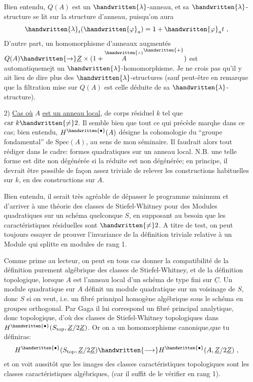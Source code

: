 Bien entendu, $Q(A)$ est un $\handwritten{\lambda}$-anneau, et sa $\handwritten{\lambda}$-structure se lit sur la structure d'anneau, puisqu'on aura
\[
\handwritten{\lambda}_t(\handwritten{\varphi}_a)=1+\handwritten{\varphi}_a t\ ,
\]
D'autre part, un homomorphisme d'anneaux augmentés $Q(A)\handwritten{\to}\underline{Z}\times(1+\overset{\handwritten{\scriptscriptstyle\wedge}}{A}^{\handwritten{+}})$ est automatiquemejt un $\handwritten{\lambda}$-homomorphisme. Je ne crois pas qu'il y ait lieu de dire plus des $\handwritten{\lambda}$-structures (sauf peut-être en remarque que la filtration mise sur $Q(A)$ est celle déduite de sa $\handwritten{\lambda}$-structure).

2) \uline{Cas où} $A$ \uline{est un anneau local}, de corps résiduel $k$ tel que $\mathrm{car}\ k\handwritten{\ne}2$. Il semble bien que tout ce qui précède marqhe dans ce cas; bien entendu, $H^{\handwritten{\bullet}}(A)$ désigne la cohomologie du ``groupe fondamental'' de $\mathrm{Spec}(A)$, au sens de mon séminaire. Il faudrait alors tout rédiger dans le cadre: formes quadratiques sur un anneau local. N.B. une telle forme est dite non dégénérée si la réduite est non dégénérée; en principe, il  devrait être possible de façon assez triviale de relever les constructions habituelles sur $k$, en des constructions sur $A$.

Bien entendu, il serait très agréable de dépasser le programme minimum et d'arriver à une théorie des classes de Stiefel-Whitney pour des Modules quadratiques sur un schéma quelconque $S$,  en supposant au besoin que les caractéristiques résiduelles sont $\handwritten{\ne}2$.  A titre de test, on peut toujours essayer de prouver l'invariance de la définition triviale relative à un Module qui splitte en modules de rang 1.

Comme prime au lecteur, on peut en tous cas donner la compatibilité de la définition purement algébrique des classes de Stiefel-Whitney, et de la définition topologique, lorsque $A$ est l'anneau local d'un schéma de type fini sur $\underline{C}$. Un module quadratique sur $A$ définit un module quadratique sur un voisinage de $S$, donc $S$ si on veut, i.e. un fibré prinnipal homogène algébrique sous le schéma en groupes orthogonal. Par Gaga il lui correspond un fibré principal analytique, donc topologique, d'où des classes de Stiefel-Whitney topologiques dans $H^{\handwritten{\bullet}}(S_{\mathrm{top}},\underline{Z}/2\underline{Z})$. Or on a un homomorphisme canonique,que tu définiras:
\[
H^{\handwritten{\bullet}}(S_{\mathrm{top}},\underline{Z}/2\underline{Z})\handwritten{\longrightarrow}H^{\handwritten{\bullet}}(A,\underline{Z}/2\underline{Z})\ ,
\]
et on voit aussitôt que les images des classes caractéristiques topologiques sont les classes caractéristiques algébriques, (car il suffit de le vérifier en rang 1).
